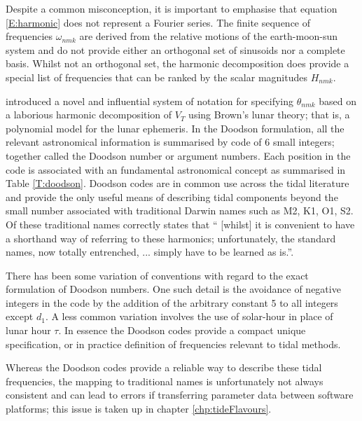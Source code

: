 Despite a common misconception, it is important to emphasise that equation \ref{E:harmonic} does not represent a Fourier series.  The finite sequence of frequencies $\omega_{nmk}$ are derived from the relative motions of the earth-moon-sun system and do not provide either an orthogonal set of sinusoids nor a complete basis.
Whilst not an orthogonal set, the harmonic decomposition does provide a special list of frequencies that can be ranked by the scalar magnitudes $H_{nmk}$. 

\citet{Doodson:1921kt} introduced a novel and influential system of notation for specifying $\theta_{nmk}$ based on a laborious harmonic decomposition of $V_T$ using Brown's lunar theory; that is, a polynomial model for the lunar ephemeris.  
In the Doodson formulation, all the relevant astronomical information is summarised by code of 6 small integers; together called the Doodson number or argument numbers.   Each position in the code is associated with an fundamental astronomical concept as summarised in Table \ref{T:doodson}.  Doodson codes are in common use across the tidal literature and provide the only useful means of describing tidal components beyond the small number associated with traditional Darwin names such as M2, K1, O1, S2.
Of these traditional names \citet{agnew2015} correctly states that `` [whilst] it is convenient to have a shorthand way of referring to these harmonics; unfortunately, the standard names,  now totally entrenched, ... simply have to be learned as is.''.

There has been some variation of conventions with regard to the exact formulation of Doodson numbers.  One such detail is the avoidance of negative integers in the code by the addition of the arbitrary constant 5 to all integers except $d_1$.   A less common variation involves the use of solar-hour in place of lunar hour $\tau$.  
In essence the Doodson codes provide a compact unique specification, or in practice definition of frequencies relevant to tidal methods.

Whereas the Doodson codes provide a reliable way to describe these tidal frequencies, the mapping to traditional names is unfortunately not always consistent and can lead to errors if transferring parameter data between software platforms; this issue is taken up in chapter \ref{chp:tideFlavours}.


